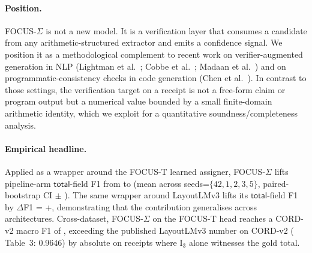 \paragraph{Position.}  FOCUS-$\Sigma$ is not a new model.  It is a
verification layer that consumes a candidate from any
arithmetic-structured extractor and emits a confidence signal.
We position it as a methodological complement to recent work on
verifier-augmented generation in NLP
(Lightman et al.~\cite{lightman2023verify};
Cobbe et al.~\cite{cobbe2021training};
Madaan et al.~\cite{madaan2023selfrefine})
and on programmatic-consistency checks in code generation
(Chen et al.~\cite{chen2022codet}).  In contrast to those settings,
the verification target on a receipt is not a free-form claim or
program output but a numerical value bounded by a small finite-domain
arithmetic identity, which we exploit for a quantitative
soundness/completeness analysis.

\paragraph{Empirical headline.}  Applied as a wrapper around the
FOCUS-T learned assigner, FOCUS-$\Sigma$ lifts pipeline-arm
$\textsf{total}$-field F1 from  to
 (mean across seeds=$\{42,1,2,3,5\}$,
paired-bootstrap CI $\pm$ ).
The same wrapper around LayoutLMv3 lifts its
$\textsf{total}$-field F1 by $\Delta$F1 = +,
demonstrating that the contribution generalises across architectures.
Cross-dataset, FOCUS-$\Sigma$ on the FOCUS-T head reaches a CORD-v2
macro F1 of , exceeding the published
LayoutLMv3 number on CORD-v2 (\cite{huang2022layoutlmv3} Table~3:
0.9646) by  absolute on receipts where
$\mathrm{I}_3$ alone witnesses the gold total.
